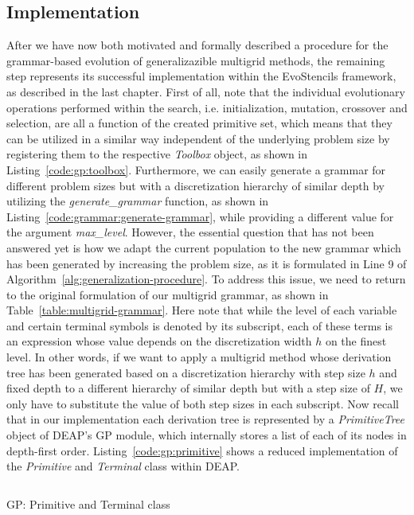 \subsection{Implementation}
After we have now both motivated and formally described a procedure for the grammar-based evolution of generalizazible multigrid methods, the remaining step represents its successful implementation within the EvoStencils framework, as described in the last chapter.
First of all, note that the individual evolutionary operations performed within the search, i.e. initialization, mutation, crossover and selection, are all a function of the created primitive set, which means that they can be utilized in a similar way independent of the underlying problem size by registering them to the respective \emph{Toolbox} object, as shown in Listing~\ref{code:gp:toolbox}.
Furthermore, we can easily generate a grammar for different problem sizes but with a discretization hierarchy of similar depth by utilizing the \emph{generate\_grammar} function, as shown in Listing~\ref{code:grammar:generate-grammar}, while providing a different value for the argument \emph{max\_level}.
However, the essential question that has not been answered yet is how we adapt the current population to the new grammar which has been generated by increasing the problem size, as it is formulated in Line 9 of Algorithm~\ref{alg:generalization-procedure}.
To address this issue, we need to return to the original formulation of our multigrid grammar, as shown in Table~\ref{table:multigrid-grammar}.
Here note that while the level of each variable and certain terminal symbols is denoted by its subscript, each of these terms is an expression whose value depends on the discretization width $h$ on the finest level.
In other words, if we want to apply a multigrid method whose derivation tree has been generated based on a discretization hierarchy with step size $h$ and fixed depth to a different hierarchy of similar depth but with a step size of $H$, we only have to substitute the value of both step sizes in each subscript.
Now recall that in our implementation each derivation tree is represented by a \emph{PrimitiveTree} object of DEAP's GP module, which internally stores a list of each of its nodes in depth-first order.
Listing~\ref{code:gp:primitive} shows a reduced implementation of the \emph{Primitive} and \emph{Terminal} class within DEAP.
\begin{listing}
	\inputminted[linenos]{python}{evostencils/gp/primitive.py}
	\caption{GP: Primitive and Terminal class}
	\label{code:gp:primitive}
\end{listing}
